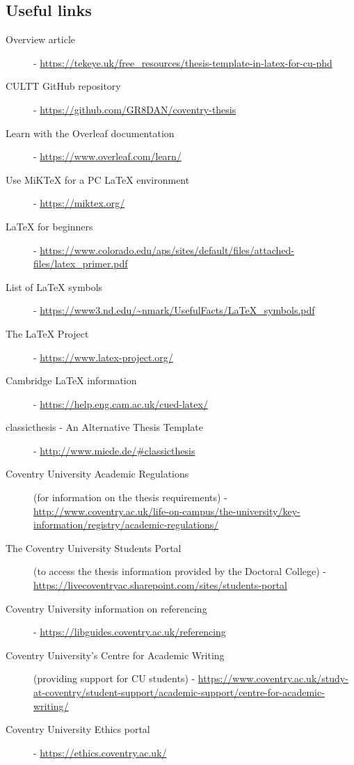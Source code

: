 \subsection*{Useful links}
\begin{description}
\item[Overview article] - \url{https://tekeye.uk/free_resources/thesis-template-in-latex-for-cu-phd}
\item[CULTT GitHub repository] - \url{https://github.com/GR8DAN/coventry-thesis}
\item[Learn with the Overleaf documentation] - \url{https://www.overleaf.com/learn/}
\item[Use MiKTeX for a PC \LaTeX{} environment] - \url{https://miktex.org/}
\item[\LaTeX{} for beginners] - \url{https://www.colorado.edu/aps/sites/default/files/attached-files/latex_primer.pdf}
\item[List of LaTeX symbols] - \url{https://www3.nd.edu/~nmark/UsefulFacts/LaTeX_symbols.pdf}
\item[The \LaTeX{} Project] - \url{https://www.latex-project.org/}
\item[Cambridge LaTeX information] - \url{https://help.eng.cam.ac.uk/cued-latex/}
\item[classicthesis - An Alternative Thesis Template] - \url{http://www.miede.de/#classicthesis}
\item[Coventry University Academic Regulations] (for information on the thesis requirements)
- \url{http://www.coventry.ac.uk/life-on-campus/the-university/key-information/registry/academic-regulations/}
\item[The Coventry University Students Portal] (to access the thesis information provided by the Doctoral College)
- \url{https://livecoventryac.sharepoint.com/sites/students-portal}
\item[Coventry University information on referencing]
- \url{https://libguides.coventry.ac.uk/referencing}
\item[Coventry University's Centre for Academic Writing] (providing support for CU students)
- \url{https://www.coventry.ac.uk/study-at-coventry/student-support/academic-support/centre-for-academic-writing/}
\item[Coventry University Ethics portal] - \url{https://ethics.coventry.ac.uk/}
\end{description}
